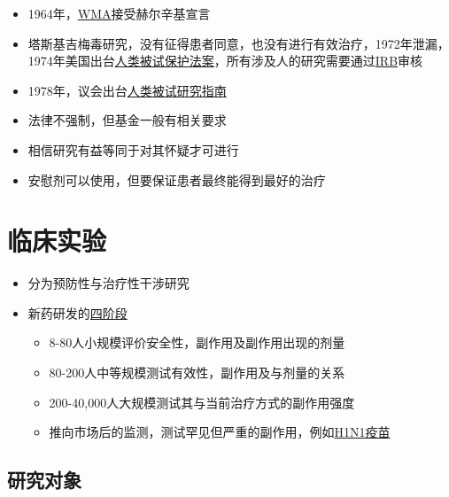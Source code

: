 \documentclass[]{book}
\providecommand{\tightlist}{%
  \setlength{\itemsep}{0pt}\setlength{\parskip}{0pt}}
\begin{document}
\begin{itemize}
\tightlist
\item
  1964年，\href{http://www.wma.net/en/60about/70history/01declarationHelsinki/index.html}{WMA}接受赫尔辛基宣言
\item
  塔斯基吉梅毒研究，没有征得患者同意，也没有进行有效治疗，1972年泄漏，1974年美国出台\href{http://www.hhs.gov/ohrp/humansubjects/guidance/45cfr46.html}{人类被试保护法案}，所有涉及人的研究需要通过\href{http://www.hhs.gov/ohrp/humansubjects/guidance/45cfr46.html\#46.107}{IRB}审核
\item
  1978年，议会出台\href{http://www.hhs.gov/ohrp/policy/belmont.html}{人类被试研究指南}
\item
  法律不强制，但基金一般有相关要求
\item
  相信研究有益等同于对其怀疑才可进行
\item
  安慰剂可以使用，但要保证患者最终能得到最好的治疗
\end{itemize}

\hypertarget{ux4e34ux5e8aux5b9eux9a8c}{%
\section{临床实验}\label{ux4e34ux5e8aux5b9eux9a8c}}

\begin{itemize}
\tightlist
\item
  分为预防性与治疗性干涉研究
\item
  新药研发的\href{https://clinicaltrials.gov/ct2/info/glossary\#phasel}{四阶段}

  \begin{itemize}
  \tightlist
  \item
    8-80人小规模评价安全性，副作用及副作用出现的剂量
  \item
    80-200人中等规模测试有效性，副作用及与剂量的关系
  \item
    200-40,000人大规模测试其与当前治疗方式的副作用强度
  \item
    推向市场后的监测，测试罕见但严重的副作用，例如\href{http://sphweb.bumc.bu.edu/otlt/MPH-Modules/EP/EP713_ClinicalTrials/H1N1_Surveillance.pdf}{H1N1疫苗}
  \end{itemize}
\end{itemize}

\hypertarget{ux7814ux7a76ux5bf9ux8c61}{%
\subsection{研究对象}\label{ux7814ux7a76ux5bf9ux8c61}}
\end{document}
